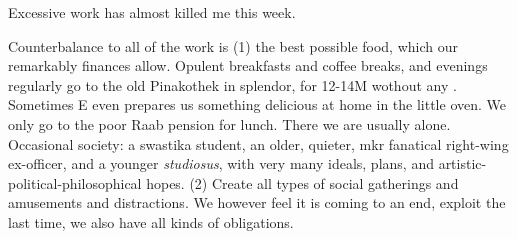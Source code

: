 \documentclass{article}
\begin{document}
Excessive work has almost killed me this week. \skipped

Counterbalance to all of the work is (1) the best possible food, which our remarkably  finances allow. Opulent breakfasts and coffee breaks, and evenings regularly go to the old Pinakothek in splendor, for 12-14M wothout any . Sometimes E even prepares us something delicious at home in the little oven\skipped. We only go to the poor Raab pension for lunch. There we are usually alone. Occasional society: a swastika student, an older, quieter, mkr fanatical right-wing ex-officer, and a younger \textit{studiosus}, with very many ideals, plans, and artistic-political-philosophical hopes. (2) Create all types of social gatherings and amusements and distractions. We however feel it is coming to an end, exploit the last time, we also have all kinds of obligations.
\skipped
\end{document}

